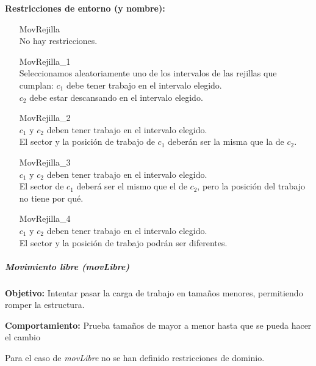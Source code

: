 \textbf{Restricciones de entorno (y nombre):}
\begin{enumerate}[align=parleft, labelsep=2cm, itemindent=5em, font=\itshape]
    \item[MovRejilla]\mbox{}\\No hay restricciones.

    \item[MovRejilla\_1]\mbox{}\\
    Seleccionamos aleatoriamente uno de los intervalos de las rejillas que cumplan:
    $c_1$ debe tener trabajo en el intervalo elegido. \\
    $c_2$ debe estar descansando en el intervalo elegido.

    \item[MovRejilla\_2]\mbox{}\\
    $c_1$ y $c_2$ deben tener trabajo en el intervalo elegido. \\
    El sector y la posición de trabajo de $c_1$ deberán ser la misma que la de $c_2$.

    \item[MovRejilla\_3]\mbox{}\\
    $c_1$ y $c_2$ deben tener trabajo en el intervalo elegido. \\
    El sector de $c_1$ deberá ser el mismo que el de $c_2$, pero la posición del trabajo no tiene por qué.

    \item[MovRejilla\_4]\mbox{}\\
    $c_1$ y $c_2$ deben tener trabajo en el intervalo elegido. \\
    El sector y la posición de trabajo podrán ser diferentes.
\end{enumerate}

\subparagraph{Movimiento libre (\textit{movLibre})}
\label{entorno:movLibre}

\textbf{Objetivo:} Intentar pasar la carga de trabajo en tamaños menores, permitiendo romper la estructura.

\textbf{Comportamiento:} Prueba tamaños de mayor a menor hasta que se pueda hacer el cambio

Para el caso de \textit{movLibre} no se han definido restricciones de dominio.

